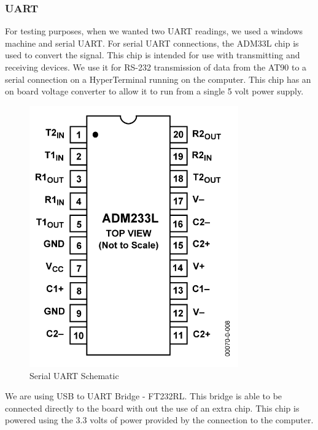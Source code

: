 \subsubsection{UART}
For testing purposes, when we wanted two UART readings, we used a windows machine and serial UART. For serial UART connections, the ADM33L chip is used to convert the signal. This chip is intended for use with transmitting and receiving devices. We use it for RS-232 transmission of data from the AT90 to a serial connection on a HyperTerminal running on the computer. This chip has an on board voltage converter to allow it to run from a single 5 volt power supply. 
\begin{figure}[h]
  \begin{center}
    \includegraphics[width=90mm]{imageSources/serialUART.png}
  \end{center}
  \caption{Serial UART Schematic} 
  \label{serialUART}
\end{figure}

We are using USB to UART Bridge - FT232RL. This bridge is able to be connected directly to the board with out the use of an extra chip. This chip is powered using the 3.3 volts of power provided by the connection to the computer. 

